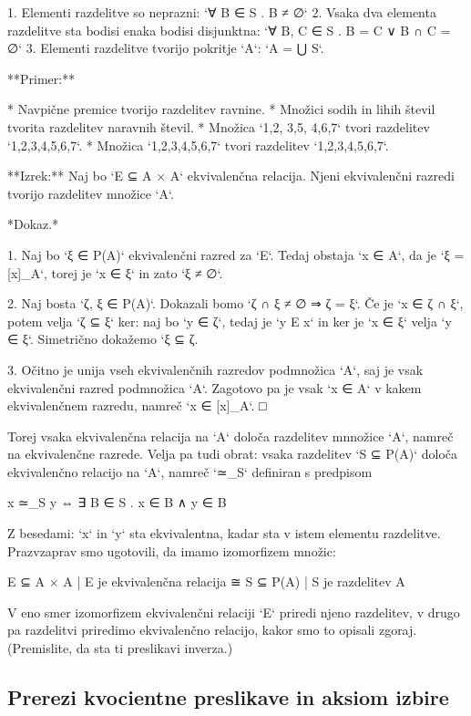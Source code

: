 1. Elementi razdelitve so neprazni: `∀ B ∈ S . B ≠ ∅`
2. Vsaka dva elementa razdelitve sta bodisi enaka bodisi disjunktna: `∀ B, C ∈ S . B = C ∨ B ∩ C = ∅`
3. Elementi razdelitve tvorijo pokritje `A`: `A = ⋃ S`.

**Primer:**

* Navpične premice tvorijo razdelitev ravnine.
* Množici sodih in lihih števil tvorita razdelitev naravnih števil.
* Množica `{{1,2}, {3,5}, {4,6,7}}` tvori razdelitev `{1,2,3,4,5,6,7}`.
* Množica `{{1,2,3,4,5,6,7}}` tvori razdelitev `{1,2,3,4,5,6,7}`.

**Izrek:** Naj bo `E ⊆ A × A` ekvivalenčna relacija. Njeni ekvivalenčni razredi tvorijo
razdelitev množice `A`.

*Dokaz.*

1. Naj bo `ξ ∈ P(A)` ekvivalenčni razred za `E`. Tedaj obstaja `x ∈ A`, da je `ξ = [x]_A`,
   torej je `x ∈ ξ` in zato `ξ ≠ ∅`.

2. Naj bosta `ζ, ξ ∈ P(A)`. Dokazali bomo `ζ ∩ ξ ≠ ∅ ⇒ ζ = ξ`. Če je `x ∈ ζ ∩ ξ`, potem
   velja `ζ ⊆ ξ` ker: naj bo `y ∈ ζ`, tedaj je `y E x` in ker je `x ∈ ξ` velja `y ∈ ξ`.
   Simetrično dokažemo `ξ ⊆ ζ.

3. Očitno je unija vseh ekvivalenčnih razredov podmnožica `A`, saj je vsak ekvivalenčni
   razred podmnožica `A`. Zagotovo pa je vsak `x ∈ A` v kakem ekvivalenčnem razredu,
   namreč `x ∈ [x]_A`. □

Torej vsaka ekvivalenčna relacija na `A` določa razdelitev mnnožice `A`, namreč na
ekvivalenčne razrede. Velja pa tudi obrat: vsaka razdelitev `S ⊆ P(A)` določa ekvivalenčno
relacijo na `A`, namreč `≃_S` definiran s predpisom

    x ≃_S y ⇔ ∃ B ∈ S . x ∈ B ∧ y ∈ B

Z besedami: `x` in `y` sta ekvivalentna, kadar sta v istem elementu razdelitve. Prazvzaprav
smo ugotovili, da imamo izomorfizem množic:

    { E ⊆ A × A | E je ekvivalenčna relacija } ≅ { S ⊆ P(A) | S je razdelitev A }

V eno smer izomorfizem ekvivalenčni relaciji `E` priredi njeno razdelitev, v drugo pa
razdelitvi priredimo ekvivalenčno relacijo, kakor smo to opisali zgoraj. (Premislite, da sta
ti preslikavi inverza.)


\subsection{Prerezi kvocientne preslikave in aksiom izbire}

